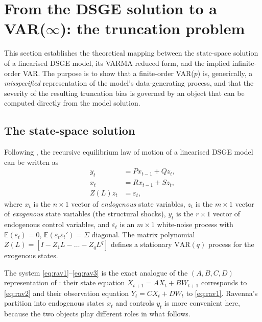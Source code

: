
\section{From the DSGE solution to a VAR($\infty$): the truncation problem}
\label{sec:varma}

This section establishes the theoretical mapping between the state-space
solution of a linearised DSGE model, its VARMA reduced form, and the
implied infinite-order VAR. The purpose is to show that a finite-order
VAR($p$) is, generically, a \emph{misspecified} representation of the
model's data-generating process, and that the severity of the resulting
truncation bias is governed by an object that can be computed directly
from the model solution.

\subsection{The state-space solution}

Following \citet{Ravenna2007}, the recursive equilibrium law of motion of
a linearised DSGE model can be written as
\begin{align}
    y_t &= P x_{t-1} + Q z_t, \label{eq:rav1}\\
    x_t &= R x_{t-1} + S z_t, \label{eq:rav2}\\
    Z(L) z_t &= \varepsilon_t, \label{eq:rav3}
\end{align}
where $x_t$ is the $n \times 1$ vector of \emph{endogenous} state
variables, $z_t$ is the $m \times 1$ vector of \emph{exogenous} state
variables (the structural shocks), $y_t$ is the $r \times 1$ vector of
endogenous control variables, and $\varepsilon_t$ is an $m \times 1$
white-noise process with $\mathbb{E}(\varepsilon_t) = 0$,
$\mathbb{E}(\varepsilon_t \varepsilon_t') = \Sigma$ diagonal. The matrix
polynomial $Z(L) = [I - Z_1 L - \dots - Z_q L^q]$ defines a stationary
$\mathrm{VAR}(q)$ process for the exogenous states.

The system \eqref{eq:rav1}--\eqref{eq:rav3} is the exact analogue of the
$(A,B,C,D)$ representation of \citet{FVRRS2005}: their state equation
$X_{t+1} = A X_t + B W_{t+1}$ corresponds to \eqref{eq:rav2} and their
observation equation $Y_t = C X_t + D W_t$ to \eqref{eq:rav1}. Ravenna's
partition into endogenous states $x_t$ and controls $y_t$ is more
convenient here, because the two objects play different roles in what
follows.

